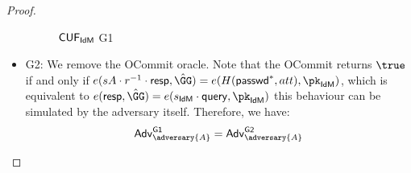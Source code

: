 \begin{proof}
\begin{itemize}
\begin{figure*}
{{\begin{pchstack}[center, space=0.2cm, boxed]
\begin{pcvstack}
    \end{pcvstack}
    \begin{pcvstack}
    \end{pcvstack}
    \end{pchstack}
}}
\caption{$\mathsf{CUF}_{\textsf{IdM}}$ \textsf{G1}}
\label{game:cuf_idmg1}
\end{figure*}

        \item \textsf{G2}: We remove the \textsf{OCommit} oracle. Note that the \textsf{OCommit} returns $\true$ if and only if $e(sA\cdot r^{-1}\cdot \response, \GGhat) = e(H(\pseudo^*, att), \pk_\idm)$, which is equivalent to $e(\response, \GGhat) = e(s_\idm\cdot\query, \pk_\idm)$  this behaviour can be simulated by the adversary itself. Therefore, we have:
        \begin{align*}
            \advtg_\adversary{A}^{\mathsf{G1}} = \advtg_\adversary{A}^{\mathsf{G2}}\\
        \end{align*}


\end{itemize}
\end{proof}
